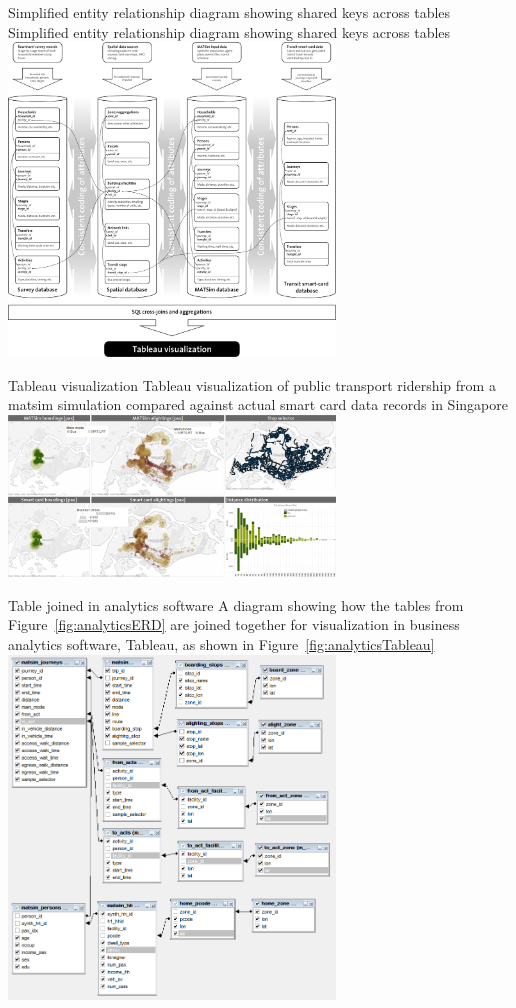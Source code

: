 \createfigure%
{Simplified entity relationship diagram showing shared keys across tables}%
{Simplified entity relationship diagram showing shared keys across tables}%
{\label{fig:analyticsERD}}%
{\includegraphics[width=0.65\textwidth, angle=0]{extending/figures/businessanalytics/schema}}%
{}

\createfigure%
{Tableau visualization}%
{Tableau visualization of public transport ridership from a \protect\gls{matsim} simulation compared against actual smart card data records in Singapore}%
{\label{fig:analyticsTableau}}%
{\includegraphics[width=0.65\textwidth, angle=0]{extending/figures/businessanalytics/tableau.png}}%
{}

\createfigure%
{Table joined in analytics software}%
{A diagram showing how the tables from Figure~\ref{fig:analyticsERD} are joined together for visualization in business analytics software, \eg Tableau, as shown in Figure~\ref{fig:analyticsTableau}}%
{\label{fig:analyticsJoin}}%
{\includegraphics[width=0.65\textwidth, angle=0]{extending/figures/businessanalytics/join}}%
{}

